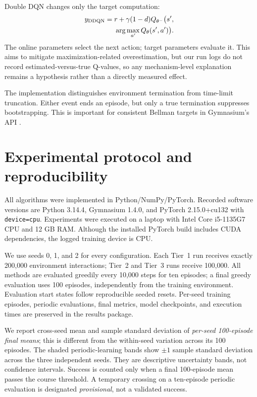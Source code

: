 \documentclass[a4paper,10pt,twocolumn]{article}
\begin{document}
Double DQN changes only the target computation:
\begin{equation}
\begin{split}
y_{\rm DDQN} = r+\gamma(1-d)Q_{\theta^-}\big(s',\\
\arg\max_{a'}Q_{\theta}(s',a')\big).
\end{split}
\end{equation}
The online parameters select the next action; target parameters evaluate it. This aims to mitigate maximization-related overestimation, but our run logs do not record estimated-versus-true Q-values, so any mechanism-level explanation remains a hypothesis rather than a directly measured effect.

The implementation distinguishes environment termination from time-limit truncation. Either event ends an episode, but only a true termination suppresses bootstrapping. This is important for consistent Bellman targets in Gymnasium's API \cite{gymapi}.

\section{Experimental protocol and reproducibility}
All algorithms were implemented in Python/NumPy/PyTorch. Recorded software versions are Python 3.14.4, Gymnasium 1.4.0, and PyTorch 2.15.0+cu132 with \texttt{device=cpu}. Experiments were executed on a laptop with Intel Core i5-1135G7 CPU and 12 GB RAM. Although the installed PyTorch build includes CUDA dependencies, the logged training device is CPU.

We use seeds 0, 1, and 2 for every configuration. Each Tier~1 run receives exactly 200,000 environment interactions; Tier~2 and Tier~3 runs receive 100,000. All methods are evaluated greedily every 10,000 steps for ten episodes; a final greedy evaluation uses 100 episodes, independently from the training environment. Evaluation start states follow reproducible seeded resets. Per-seed training episodes, periodic evaluations, final metrics, model checkpoints, and execution times are preserved in the results package.

We report cross-seed mean and sample standard deviation of \emph{per-seed 100-episode final means}; this is different from the within-seed variation across its 100 episodes. The shaded periodic-learning bands show $\pm1$ sample standard deviation across the three independent seeds. They are descriptive uncertainty bands, not confidence intervals. Success is counted only when a final 100-episode mean passes the course threshold. A temporary crossing on a ten-episode periodic evaluation is designated \emph{provisional}, not a validated success.
\end{document}

